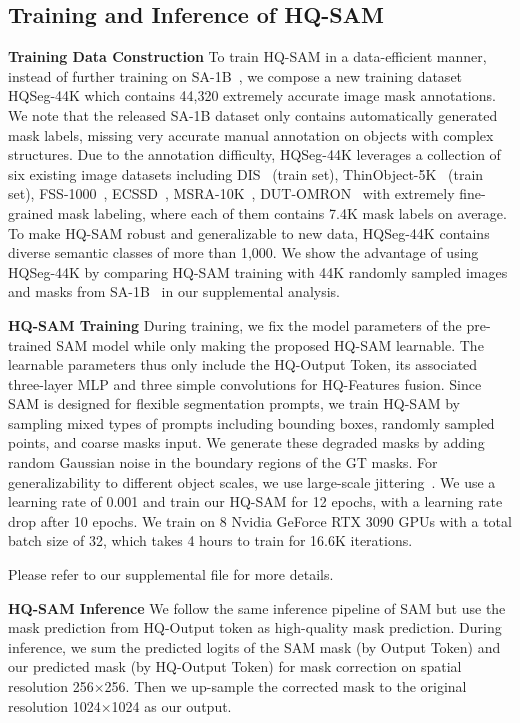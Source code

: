 \subsection{Training and Inference of HQ-SAM}
\label{sec:sam_hf_training}
\textbf{Training Data Construction} To train HQ-SAM in a data-efficient manner, instead of further training on SA-1B~\cite{sam}, we compose a new training dataset HQSeg-44K which contains 44,320 extremely accurate image mask annotations. We note that the released SA-1B dataset only contains automatically generated mask labels, missing very accurate manual annotation on objects with complex structures. Due to the annotation difficulty, HQSeg-44K leverages a collection of six existing image datasets including DIS~\cite{qin2022} (train set), ThinObject-5K~\cite{liew2021deep} (train set), FSS-1000~\cite{li2020fss}, ECSSD~\cite{shi2015hierarchical}, MSRA-10K~\cite{cheng2014global}, DUT-OMRON~\cite{yang2013saliency} with extremely fine-grained mask labeling, where each of them contains 7.4K mask labels on average. To make HQ-SAM robust and generalizable to new data, HQSeg-44K contains diverse semantic classes of more than 1,000. We show the advantage of using HQSeg-44K by comparing HQ-SAM training with 44K randomly sampled images and masks from SA-1B~\cite{sam} in our supplemental analysis.

\textbf{HQ-SAM Training} During training, we fix the model parameters of the pre-trained SAM model while only making the proposed HQ-SAM learnable. The learnable parameters thus only include the HQ-Output Token, its associated three-layer MLP and three simple convolutions for HQ-Features fusion. Since SAM is designed for flexible segmentation prompts, we train HQ-SAM by sampling mixed types of prompts including bounding boxes, randomly sampled points, and coarse masks input. We generate these degraded masks by adding random Gaussian noise in the boundary regions of the GT masks. For generalizability to different object scales, we use large-scale jittering~\cite{ghiasi2021simple}. We use a learning rate of 0.001 and train our HQ-SAM for 12 epochs, with a learning rate drop after 10 epochs. We train on 8 Nvidia GeForce RTX 3090 GPUs with a total batch size of 32, which takes 4 hours to train for 16.6K iterations.

Please refer to our supplemental file for more details.

\textbf{HQ-SAM Inference} We follow the same inference pipeline of SAM but use the mask prediction from HQ-Output token as high-quality mask prediction. During inference, we sum the predicted logits of the SAM mask (by Output Token) and our predicted mask (by HQ-Output Token) for mask correction on spatial resolution 256$\times$256. Then we up-sample the corrected mask to the original resolution 1024$\times$1024 as our output.

